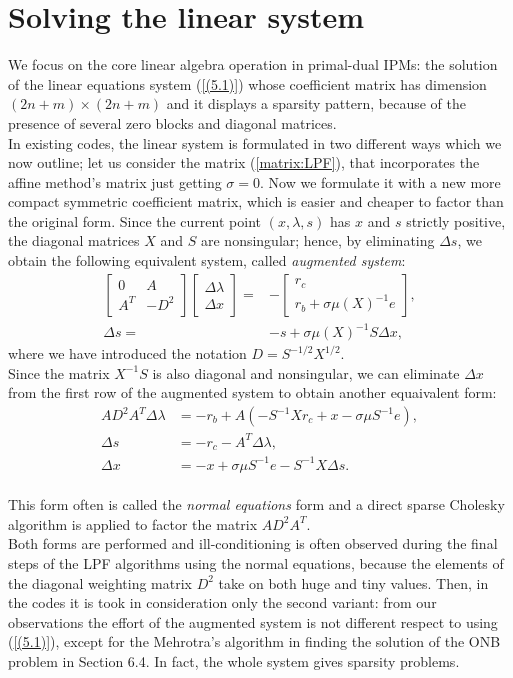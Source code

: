 \documentclass[a4paper,10 pt,titlepage,twoside]{report}
\theoremstyle{plain}
\theoremstyle{definition}
\theoremstyle{remark}
\begin{document}
{{\section*{Solving the linear system}
We focus on the core linear algebra operation in primal-dual IPMs: the solution of the linear equations system (\ref{(5.1)})
whose coefficient matrix has dimension $(2n+m)\times(2n+m)$ and it displays a sparsity pattern, because of the presence of several zero blocks and diagonal matrices.\\In existing codes, the linear
system is formulated in two different ways which we now outline; let us consider the matrix (\ref{matrix:LPF}), that incorporates the affine method's matrix just getting $\sigma=0$.
Now we formulate it with a new more compact symmetric coefficient matrix, which
is easier and cheaper to factor than the original form. Since the current point $(x, \lambda, s)$ has $x$ and $s$ strictly
positive, the diagonal matrices $X$ and $S$ are nonsingular; hence, by eliminating $\Delta s$, we obtain the following equivalent system, called \textit{augmented system}:
\begin{align*}
\begin{bmatrix}
0&A\\A^{T}&-D^{2}
\end{bmatrix}\begin{bmatrix}
\Delta\lambda \\\Delta x
\end{bmatrix}=&-\begin{bmatrix}
r_{c}\\r_{b} + \sigma\mu(X)^{-1}e
\end{bmatrix},\\
\Delta s =& -s +\sigma\mu (X)^{-1}S\Delta x,
\end{align*}
where we have introduced the notation $D = S^{-1/2}X^{1/2}$.\\
Since the matrix $X^{-1}S$ is also diagonal and nonsingular, we can eliminate $\Delta x$ from the first row of the augmented system to obtain another equaivalent form:
\begin{align*}
AD^{2}A^{T}\Delta\lambda &= -r_{b}+A(-S^{-1}Xr_{c}+ x - \sigma\mu S^{-1}e),\\
\Delta s &= -r_{c}-A^{T}\Delta \lambda,\\
\Delta x &= -x + \sigma \mu S^{-1}e-S^{-1}X\Delta s.
\end{align*}
\\
This form often is called the \textit{normal equations} form and a direct sparse Cholesky algorithm is applied to factor the matrix $AD^{2}A^{T}$. \\Both forms are performed and ill-conditioning is often observed during the final steps of the LPF algorithms using the normal equations, because the elements of the diagonal weighting
matrix $D^{2}$ take on both huge and tiny values.
Then, in the codes it is took in consideration only the second variant: from our observations the effort of the augmented system is not different respect to using (\ref{(5.1)}), except for the Mehrotra's algorithm in finding the solution of the ONB problem in Section 6.4. In fact, the whole system gives sparsity problems. 
}}
\end{document}
